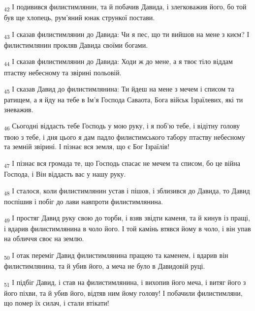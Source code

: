 \begin{tcolorbox}
\textsubscript{42} І подивився филистимлянин, та й побачив Давида, і злегковажив його, бо той був ще хлопець, рум'яний юнак стрункої постави.
\end{tcolorbox}
\begin{tcolorbox}
\textsubscript{43} І сказав филистимлянин до Давида: Чи я пес, що ти вийшов на мене з києм? І филистимлянин прокляв Давида своїми богами.
\end{tcolorbox}
\begin{tcolorbox}
\textsubscript{44} І сказав филистимлянин до Давида: Ходи ж до мене, а я твоє тіло віддам птаству небесному та звірині польовій.
\end{tcolorbox}
\begin{tcolorbox}
\textsubscript{45} І сказав Давид до филистимлянина: Ти йдеш на мене з мечем і списом та ратищем, а я йду на тебе в Ім'я Господа Саваота, Бога військ Ізраїлевих, які ти зневажив.
\end{tcolorbox}
\begin{tcolorbox}
\textsubscript{46} Сьогодні віддасть тебе Господь у мою руку, і я поб'ю тебе, і відітну голову твою з тебе, і дня цього я дам падло филистимського табору птаству небесному та земній звірині. І пізнає вся земля, що є Бог Ізраїлів!
\end{tcolorbox}
\begin{tcolorbox}
\textsubscript{47} І пізнає вся громада те, що Господь спасає не мечем та списом, бо це війна Господа, і Він віддасть вас у нашу руку.
\end{tcolorbox}
\begin{tcolorbox}
\textsubscript{48} І сталося, коли филистимлянин устав і пішов, і зблизився до Давида, то Давид поспішив і побіг до лави навпроти филистимлянина.
\end{tcolorbox}
\begin{tcolorbox}
\textsubscript{49} І простяг Давид руку свою до торби, і взяв звідти каменя, та й кинув із пращі, і вдарив филистимлянина в чоло його. І той камінь втявся йому в чоло, і він упав на обличчя своє на землю.
\end{tcolorbox}
\begin{tcolorbox}
\textsubscript{50} І отак переміг Давид филистимлянина пращею та каменем, і вдарив він филистимлянина, та й убив його, а меча не було в Давидовій руці.
\end{tcolorbox}
\begin{tcolorbox}
\textsubscript{51} І підбіг Давид, і став на филистимлянина, і вихопив його меча, і витяг його з його піхви, та й убив його, відтяв ним йому голову! І побачили филистимляни, що помер їх силач, і стали втікати!
\end{tcolorbox}
